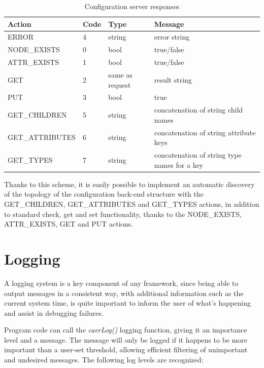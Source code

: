 \documentclass[a4paper,12pt]{report}
\begin{document}
\begin{table}[H]
\begin{center}
\caption{Configuration server responses}
\label{tab:configuration_server_responses}
\begin{tabu} to \linewidth {|l|l|X|X|}
\hline
Action & Code & Type & Message \\ \hline
ERROR & 4 & string & error string \\ \hline
NODE\_EXISTS & 0 & bool & true/false \\ \hline
ATTR\_EXISTS & 1 & bool & true/false \\ \hline
GET & 2 & same as request & result string \\ \hline
PUT & 3 & bool & true \\ \hline
GET\_CHILDREN & 5 & string & concatenation of string child names \\ \hline
GET\_ATTRIBUTES & 6 & string & concatenation of string attribute keys \\ \hline
GET\_TYPES & 7 & string & concatenation of string type names for a key \\ \hline
\end{tabu}
\end{center}
\end{table}

Thanks to this scheme, it is easily possible to implement an automatic discovery of the topology of the configuration back-end structure with the GET\_CHILDREN, GET\_ATTRIBUTES and GET\_TYPES actions, in addition to standard check, get and set functionality, thanks to the NODE\_EXISTS, ATTR\_EXISTS, GET and PUT actions.

\section{Logging} \label{sec:logging}

A logging system is a key component of any framework, since being able to output messages in a consistent way, with additional information such as the current system time, is quite important to inform the user of what's happening and assist in debugging failures.

Program code can call the \emph{caerLog()} logging function, giving it an importance level and a message. The message will only be logged if it happens to be more important than a user-set threshold, allowing efficient filtering of unimportant and undesired messages.
The following log levels are recognized:
\end{document}
